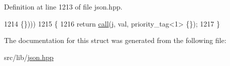 Definition at line 1213 of file json.\+hpp.


\begin{DoxyCode}
1214                                                                               \{\})))
1215     \{
1216         \textcolor{keywordflow}{return} \hyperlink{structnlohmann_1_1detail_1_1from__json__fn_a2d6108c9d0f54e97134203984ed8d3a3}{call}(j, val, priority\_tag<1> \{\});
1217     \}
\end{DoxyCode}


The documentation for this struct was generated from the following file\+:\begin{DoxyCompactItemize}
\item 
src/lib/\hyperlink{json_8hpp}{json.\+hpp}\end{DoxyCompactItemize}
